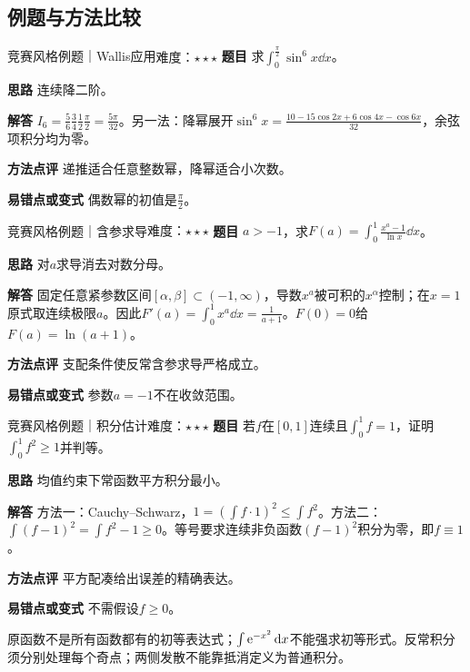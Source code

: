 \subsection{例题与方法比较}
\begin{example}{竞赛风格例题｜Wallis应用}{难度：$\star\star\star$}
\label{ex:3:13}\textbf{题目} 求$\int_0^{\frac{\pi}{2}}\sin^6x\dd x$。\par
\textbf{思路} 连续降二阶。\par
\textbf{解答} $I_6=\frac56\frac34\frac12\frac\pi2=\frac{5\pi}{32}$。另一法：降幂展开$\sin^6x=\frac{10-15\cos2x+6\cos4x-\cos6x}{32}$，余弦项积分均为零。\par
\textbf{方法点评} 递推适合任意整数幂，降幂适合小次数。\par
\textbf{易错点或变式} 偶数幂的初值是$\frac{\pi}{2}$。
\end{example}
\begin{example}{竞赛风格例题｜含参求导}{难度：$\star\star\star$}
\label{ex:3:14}\textbf{题目} $a>-1$，求$F(a)=\int_0^1\frac{x^a-1}{\ln x}\dd x$。\par
\textbf{思路} 对$a$求导消去对数分母。\par
\textbf{解答} 固定任意紧参数区间$[\alpha,\beta]\subset(-1,\infty)$，导数$x^a$被可积的$x^\alpha$控制；在$x=1$原式取连续极限$a$。因此$F\prime(a)=\int_0^1x^a\dd x=\frac{1}{a+1}$。$F(0)=0$给$F(a)=\ln(a+1)$。\par
\textbf{方法点评} 支配条件使反常含参求导严格成立。\par
\textbf{易错点或变式} 参数$a=-1$不在收敛范围。
\end{example}
\begin{example}{竞赛风格例题｜积分估计}{难度：$\star\star\star$}
\label{ex:3:15}\textbf{题目} 若$f$在$[0,1]$连续且$\int_0^1f=1$，证明$\int_0^1f^2\ge1$并判等。\par
\textbf{思路} 均值约束下常函数平方积分最小。\par
\textbf{解答} 方法一：Cauchy--Schwarz，$1=(\int f\cdot1)^2\le\int f^2$。方法二：$\int(f-1)^2=\int f^2-1\ge0$。等号要求连续非负函数$(f-1)^2$积分为零，即$f\equiv1$。\par
\textbf{方法点评} 平方配凑给出误差的精确表达。\par
\textbf{易错点或变式} 不需假设$f\ge0$。
\end{example}
\begin{warning}原函数不是所有函数都有的初等表达式；$\int\mathrm{e}^{-x^2}\mathop{}\!\mathrm{d} x$不能强求初等形式。反常积分须分别处理每个奇点；两侧发散不能靠抵消定义为普通积分。\end{warning}


